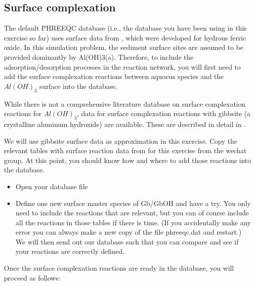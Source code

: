 \subsection[Surface complexation]{Surface complexation}

The default PHREEQC database (i.e., the database you have been using in this exercise so far) uses surface data from \cite{Dzombak1990}, which were developed for hydrous ferric oxide. In this simulation problem, the sediment surface sites are assumed to be provided dominantly by Al(OH)3(a). Therefore, to include the adsorption/desorption processes in the reaction network, you will first need to add the surface complexation reactions between 
aquoeus species and the $Al(OH)_3$ surface into the database. 

While there is not a comprehensive literature database on surface complexation reactions for $Al(OH)_3$, data for surface complexation reactions with gibbsite (a crystalline aluminum hydroxide) are available.
These are described in detail in \cite{Karamalidis2010}.

We will use gibbsite surface data as approximation in this exercise. Copy the relevant tables with surface reaction data from \cite{Karamalidis2010} for this exercise from the wechat group. At this point, you should know how and where to add those reactions into the database. 

\begin{itemize}

\item Open your database file

\item Define one new surface master species of Gb/GbOH and have a try. You only need to include the reactions that are relevant, but you can of course include all the reactions in those tables if there is time. (If you accidentally make any error you can always make a new copy of the file phreeqc.dat and restart.) We will then send out our database such that you can compare and see if your reactions are correctly defined. 

\end{itemize}

Once the surface complexation reactions are ready in the database, you will proceed as follows:

